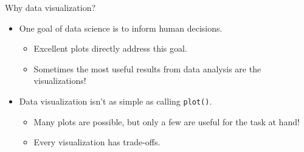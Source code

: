 \documentclass[aspectratio=169]{../latex_main/tntbeamer}  %
\begin{document}
	\begin{frame}[c]{Why data visualization?}
	    \begin{itemize}
	        \item One goal of data science is to inform human decisions.
	        \begin{itemize}
	            \item Excellent plots directly address this goal.
	            \item Sometimes the most useful results from data analysis are the visualizations!
	        \end{itemize}
	        \item Data visualization isn’t as simple as calling \texttt{plot()}.
	        \begin{itemize}
	            \item Many plots are possible, but only a few are useful for the task at hand!
	            \item Every visualization has trade-offs.
	        \end{itemize}
	    \end{itemize}
	\end{frame}
	
	
	
\end{document}

